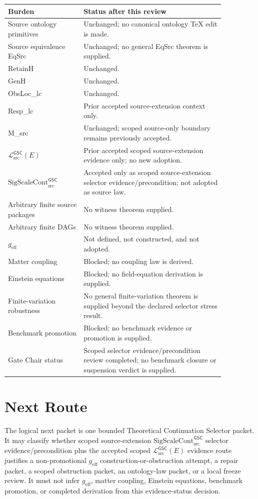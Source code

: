 \documentclass[11pt]{article}
\newcommand{\MetricData}{\mathcal{L}_{\mathrm{src}}^{\mathsf{GSC}}}
\newcommand{\geff}{g_{\mathrm{eff}}}
\newcommand{\SigScaleCont}{\mathrm{SigScaleCont}_{\mathrm{src}}^{\mathsf{GSC}}}
\begin{document}
\begin{longtable}{p{0.30\linewidth}p{0.56\linewidth}}
\toprule
Burden & Status after this review \\
\midrule
Source ontology primitives & Unchanged; no canonical ontology TeX edit is made. \\
Source equivalence EqSrc & Unchanged; no general EqSrc theorem is supplied. \\
RetainH & Unchanged. \\
GenH & Unchanged. \\
ObsLoc\_lc & Unchanged. \\
Resp\_lc & Prior accepted source-extension context only. \\
M\_src & Unchanged; scoped source-only boundary remains previously accepted. \\
\(\MetricData(E)\) & Prior accepted scoped source-extension evidence only; no new adoption. \\
\(\SigScaleCont\) & Accepted only as scoped source-extension selector evidence/precondition; not adopted as source law. \\
Arbitrary finite source packages & No witness theorem supplied. \\
Arbitrary finite DAGs & No witness theorem supplied. \\
\(\geff\) & Not defined, not constructed, and not adopted. \\
Matter coupling & Blocked; no coupling law is derived. \\
Einstein equations & Blocked; no field-equation derivation is supplied. \\
Finite-variation robustness & No general finite-variation theorem is supplied beyond the declared selector stress result. \\
Benchmark promotion & Blocked; no benchmark evidence or promotion is supplied. \\
Gate Chair status & Scoped selector evidence/precondition review completed; no benchmark closure or suspension verdict is supplied. \\
\bottomrule
\end{longtable}

\section{Next Route}

The logical next packet is one bounded Theoretical Continuation Selector
packet. It may classify whether scoped source-extension \(\SigScaleCont\)
selector evidence/precondition plus the accepted scoped \(\MetricData(E)\)
evidence route justifies a non-promotional \(\geff\)
construction-or-obstruction attempt, a repair packet, a scoped obstruction
packet, an ontology-law packet, or a local freeze review. It must not infer
\(\geff\), matter coupling, Einstein equations, benchmark promotion, or
completed derivation from this evidence-status decision.
\end{document}
